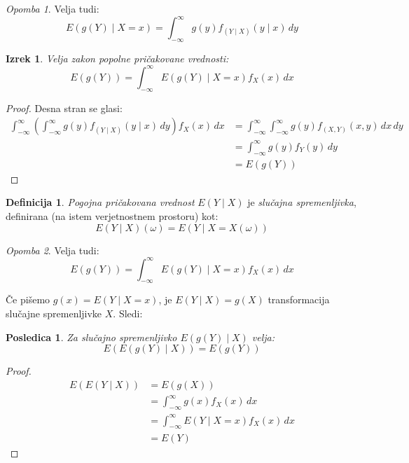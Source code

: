 \documentclass[12pt]{book}
\def\n{\noindent}
\theoremstyle{definition}
\newtheorem{definicija}{Definicija}
\theoremstyle{plain}
\newtheorem{izrek}{Izrek}
\theoremstyle{plain}
\theoremstyle{plain}
\theoremstyle{plain}
\newtheorem{posledica}{Posledica}
\theoremstyle{remark}
\newtheorem*{opomba}{Opomba}
\begin{document}
\begin{opomba}
    Velja tudi: 
    $$
    E(g(Y) \mid X=x)=\int_{-\infty}^{\infty} g(y) f_{(Y \mid X)}(y \mid x) \, d y
    $$
\end{opomba}

\begin{izrek}
    Velja zakon popolne pričakovane vrednosti:
    $$
    E(g(Y))=\int_{-\infty}^{\infty} E(g(Y) \mid X=x) f_X(x)\, d x
    $$
\end{izrek}

\begin{proof}
    Desna stran se glasi:
    $$
    \begin{aligned}
        \int_{-\infty}^{\infty}\left(\int_{-\infty}^{\infty} g(y) f_{(Y \mid X)}(y \mid x)\,  d y\right) f_X(x) \, d x&=\int_{-\infty}^{\infty} \int_{-\infty}^{\infty} g(y) f_{(X, Y)}(x, y) \, d x \, d y \\
        &=\int_{-\infty}^{\infty} g(y) f_Y(y) \, d y \\
        &=E(g(Y))
    \end{aligned}
    $$
\end{proof}

\begin{definicija}
    \emph{Pogojna pričakovana vrednost} $E(Y \mid X)$ je \emph{slučajna spremenljivka}, definirana (na istem verjetnostnem prostoru) kot: 
    $$
    E(Y \mid X)(\omega)=E(Y \mid X=X(\omega))
    $$
\end{definicija}

\begin{opomba}
    Velja tudi: 
    $$
    E(g(Y))=\int_{-\infty}^{\infty} E(g(Y) \mid X=x) f_X(x) \, d x
    $$
\end{opomba}

\n Če pišemo $g(x)=E(Y \mid X=x)$, je $E(Y \mid X)=g(X)$ transformacija slučajne spremenljivke $X$. Sledi:

\begin{posledica}
    Za slučajno spremenljivko $E(g(Y) \mid X)$ velja: 
    $$
    E(E(g(Y) \mid X))=E(g(Y))
    $$
\end{posledica}

\begin{proof}
    $$
    \begin{aligned}
        E(E(Y \mid X))&=E(g(X)) \\
        &=\int_{-\infty}^{\infty} g(x) f_X(x) \, d x \\
        &=\int_{-\infty}^{\infty} E(Y \mid X=x) f_X(x) \, d x \\
        &=E(Y)
    \end{aligned}
    $$    
\end{proof}
\end{document}

